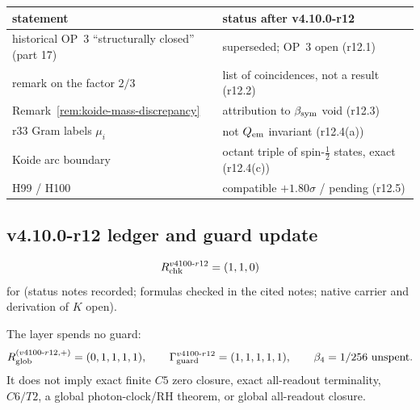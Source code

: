\begin{center}
\small
\begin{tabular}{@{}>{\raggedright\arraybackslash}p{}>{\raggedright\arraybackslash}p{}@{}}
\toprule
statement & status after v4.10.0-r12\\
\midrule
historical OP~3 ``structurally closed'' (part 17) & superseded; OP~3 open (r12.1)\\
remark on the factor \(2/3\) & list of coincidences, not a result (r12.2)\\
Remark~\ref{rem:koide-mass-discrepancy} & attribution to \(\beta_{\rm sym}\) void (r12.3)\\
r33 Gram labels \(\mu_i\) & not \(Q_{\rm em}\) invariant (r12.4(a))\\
Koide arc boundary & octant triple of spin-\(\tfrac12\) states, exact (r12.4(c))\\
H99 / H100 & compatible \(+1.80\sigma\) / pending (r12.5)\\
\bottomrule
\end{tabular}
\end{center}

\subsection*{v4.10.0-r12 ledger and guard update}
\label{subsec:v4100-r12-ledger-guard}

\[
R_{\rm chk}^{v4100\text{-}r12}=(1,1,0)
\]
for (status notes recorded; formulas checked in the cited notes; native carrier and derivation of \(K\) open).

The layer spends no guard:
\[
R_{\rm glob}^{(v4100\text{-}r12,+)}=(0,1,1,1,1),
\qquad
\Gamma_{\rm guard}^{v4100\text{-}r12}=(1,1,1,1,1),
\qquad
\beta_4=1/256\ \text{unspent}.
\]
It does not imply exact finite \(C5\) zero closure, exact all-readout terminality,
\(C6/T2\), a global photon-clock/RH theorem, or global all-readout closure.

